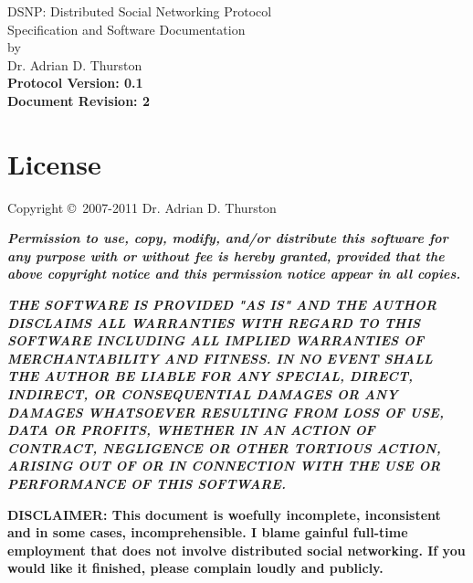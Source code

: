 \documentclass[letterpaper,11pt,oneside]{article}
\begin{document}
%
%

\thispagestyle{empty}
\begin{center}
{\huge DSNP: Distributed Social Networking Protocol}\\
\vspace*{12pt}
{\Large Specification and Software Documentation}\\
\vspace{12pt}
by\\
\vspace{12pt}
{\large Dr. Adrian D. Thurston}\\
\vspace{22pt}
{\noindent\bf\large Protocol Version: 0.1}\\
\vspace{12pt}
{\noindent\bf\large Document Revision: 2}
\end{center}


\vspace{1.5in}

\section*{License}

Copyright \copyright\ 2007-2011 Dr. Adrian D. Thurston

\vspace{5pt}

{\bf\it\noindent Permission to use, copy, modify, and/or distribute this
software for any purpose with or without fee is hereby granted, provided that
the above copyright notice and this permission notice appear in all copies.}

\vspace{5pt}

{\bf\it\noindent
THE SOFTWARE IS PROVIDED "AS IS" AND THE AUTHOR DISCLAIMS ALL WARRANTIES
WITH REGARD TO THIS SOFTWARE INCLUDING ALL IMPLIED WARRANTIES OF
MERCHANTABILITY AND FITNESS. IN NO EVENT SHALL THE AUTHOR BE LIABLE FOR
ANY SPECIAL, DIRECT, INDIRECT, OR CONSEQUENTIAL DAMAGES OR ANY DAMAGES
WHATSOEVER RESULTING FROM LOSS OF USE, DATA OR PROFITS, WHETHER IN AN
ACTION OF CONTRACT, NEGLIGENCE OR OTHER TORTIOUS ACTION, ARISING OUT OF
OR IN CONNECTION WITH THE USE OR PERFORMANCE OF THIS SOFTWARE.}

\vspace{1.5in}

{\noindent\bf\large DISCLAIMER: This document is woefully incomplete,
inconsistent and in some cases, incomprehensible. I blame gainful full-time
employment that does not involve distributed social networking. If you would
like it finished, please complain loudly and publicly.}
\end{document}
